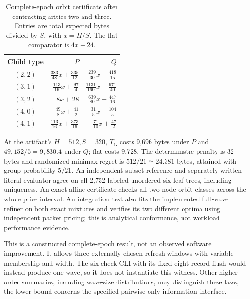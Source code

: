 \begin{table}[t]\centering\footnotesize
\caption{Complete-epoch orbit certificate after contracting arities two and
three. Entries are total expected bytes divided by $S$, with $x=H/S$.
The flat comparator is $4x+24$.}\label{tab:strict-orbits}
\begin{tabular}{@{}crr@{}}\toprule
Child type & $P$ & $Q$\\\midrule
$(2,2)$ & $\frac{383}{48}x+\frac{335}{12}$ & $\frac{239}{30}x+\frac{418}{15}$\\
$(3,1)$ & $\frac{113}{16}x+\frac{97}{4}$ & $\frac{1131}{160}x+\frac{971}{40}$\\
$(3,2)$ & $8x+28$ & $\frac{639}{80}x+\frac{447}{16}$\\
$(4,0)$ & $\frac{49}{8}x+\frac{41}{2}$ & $\frac{31}{5}x+\frac{104}{5}$\\
$(4,1)$ & $\frac{113}{16}x+\frac{373}{16}$ & $\frac{71}{10}x+\frac{47}{2}$\\
\bottomrule\end{tabular}
\end{table}

At the artifact's $H=512,S=320$, $T_G$ costs 9,696 bytes under $P$
and $49,152/5=9,830.4$ under $Q$; flat costs 9,728.
The deterministic penalty is 32 bytes and randomized minimax regret is
$512/21\simeq24.381$ bytes, attained with group probability $5/21$.
An independent subset reference and separately written literal evaluator
agree on all 2,752 labeled unordered six-leaf trees, including uniqueness.
An exact affine certificate checks all two-node orbit classes across the
whole price interval. An integration test also fits the implemented full-wave
refiner on both exact mixtures and verifies its two different optima using
independent packet pricing; this is analytical conformance, not workload
performance evidence.

This is a constructed complete-epoch result, not an observed software
improvement. It allows three externally chosen refresh windows with
variable membership and width. The six-check CLI with its fixed eight-record
flush would instead produce one wave, so it does not instantiate this witness.
Other higher-order summaries, including wave-size distributions, may
distinguish these laws; the lower bound concerns the specified pairwise-only
information interface.
